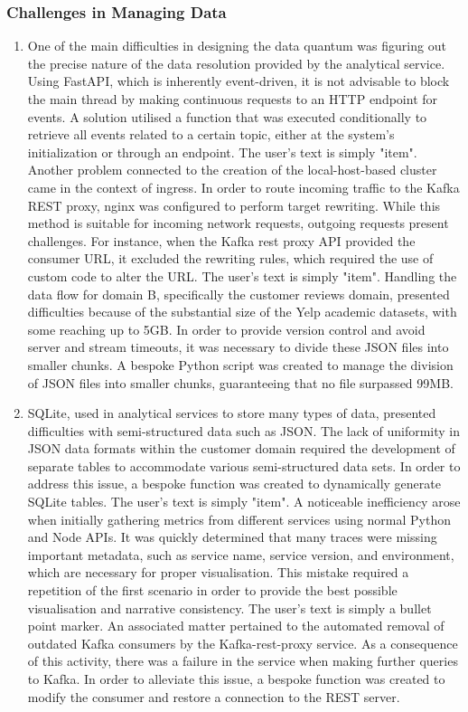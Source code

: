 \documentclass[journal]{IEEEtran}
\begin{document}
\subsubsection{Challenges in Managing Data} 
\begin{enumerate}
    \item One of the main difficulties in designing the data quantum was figuring out the precise nature of the data resolution provided by the analytical service. Using FastAPI, which is inherently event-driven, it is not advisable to block the main thread by making continuous requests to an HTTP endpoint for events. A solution utilised a function that was executed conditionally to retrieve all events related to a certain topic, either at the system's initialization or through an endpoint.
    The user's text is simply "item". Another problem connected to the creation of the local-host-based cluster came in the context of ingress. In order to route incoming traffic to the Kafka REST proxy, nginx was configured to perform target rewriting. While this method is suitable for incoming network requests, outgoing requests present challenges. For instance, when the Kafka rest proxy API provided the consumer URL, it excluded the rewriting rules, which required the use of custom code to alter the URL.
    The user's text is simply "item". Handling the data flow for domain B, specifically the customer reviews domain, presented difficulties because of the substantial size of the Yelp academic datasets, with some reaching up to 5GB. In order to provide version control and avoid server and stream timeouts, it was necessary to divide these JSON files into smaller chunks. A bespoke Python script was created to manage the division of JSON files into smaller chunks, guaranteeing that no file surpassed 99MB.
    \item SQLite, used in analytical services to store many types of data, presented difficulties with semi-structured data such as JSON. The lack of uniformity in JSON data formats within the customer domain required the development of separate tables to accommodate various semi-structured data sets. In order to address this issue, a bespoke function was created to dynamically generate SQLite tables.
    The user's text is simply "item". A noticeable inefficiency arose when initially gathering metrics from different services using normal Python and Node APIs. It was quickly determined that many traces were missing important metadata, such as service name, service version, and environment, which are necessary for proper visualisation. This mistake required a repetition of the first scenario in order to provide the best possible visualisation and narrative consistency.
    The user's text is simply a bullet point marker. An associated matter pertained to the automated removal of outdated Kafka consumers by the Kafka-rest-proxy service. As a consequence of this activity, there was a failure in the service when making further queries to Kafka. In order to alleviate this issue, a bespoke function was created to modify the consumer and restore a connection to the REST server.
\end{enumerate}
\end{document}
